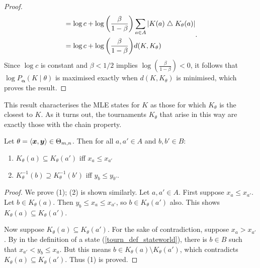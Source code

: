 \begin{proof}
\[\begin{aligned}
           &=
              \log{c}
              +
              \log{\left(\frac{\beta}{1 - \beta}\right)}
              \sum_{a \in A}{
                  |K(a) \mathrel{\triangle} K_\theta(a)|
              } \\
           &=
              \log{c}
              +
              \log{\left(\frac{\beta}{1 - \beta}\right)}
              d(K, K_\theta)
       \end{aligned}.
    \]
    Since $\log{c}$ is constant and $\beta < 1/2$ implies
    $\log{\left(\frac{\beta}{1 - \beta}\right)} < 0$, it follows that
    $\log{P_{\bm{\alpha}}(K \mid \theta)}$ is maximised exactly when $d(K,
    K_\theta)$ is minimised, which proves the result.
\end{proof}

This result characterises the MLE states for $K$ as those for which $K_\theta$
is the closest to $K$. As it turns out, the tournaments $K_\theta$ that arise
in this way are exactly those with the chain property.

\begin{lemma}
   \label{tourn_result_ktheta_ordering}

   Let $\theta = \langle {\bm{x}, \bm{y}} \rangle \in \Theta_{m,n}$. Then for all
   $a, a' \in A$ and $b, b' \in B$:

   \begin{enumerate}
       \item $K_\theta(a) \subseteq K_\theta(a')$ iff $x_a \le
             x_{a'}$
       \item $K_\theta^{-1}(b) \supseteq K_\theta^{-1}(b')$ iff $y_b
             \le y_{b'}$.
   \end{enumerate}
\end{lemma}

\begin{proof}

    We prove (1); (2) is shown similarly. Let $a, a' \in A$. First suppose $x_a
    \le x_{a'}$. Let $b \in K_\theta(a)$. Then $y_b \le x_a \le x_{a'}$, so $b
    \in K_\theta(a')$ also. This shows $K_\theta(a) \subseteq K_\theta(a')$.

    Now suppose $K_\theta(a) \subseteq K_\theta(a')$. For the sake of
    contradiction, suppose $x_a > x_{a'}$. By 
    in the definition of a state (\cref{tourn_def_stateworld}), there is $b \in B$
    such that $x_{a'} < y_b \le x_{a}$. But this means $b \in K_\theta(a)
    \setminus K_\theta(a')$, which contradicts $K_\theta(a) \subseteq
    K_\theta(a')$. Thus (1) is proved.
\end{proof}

